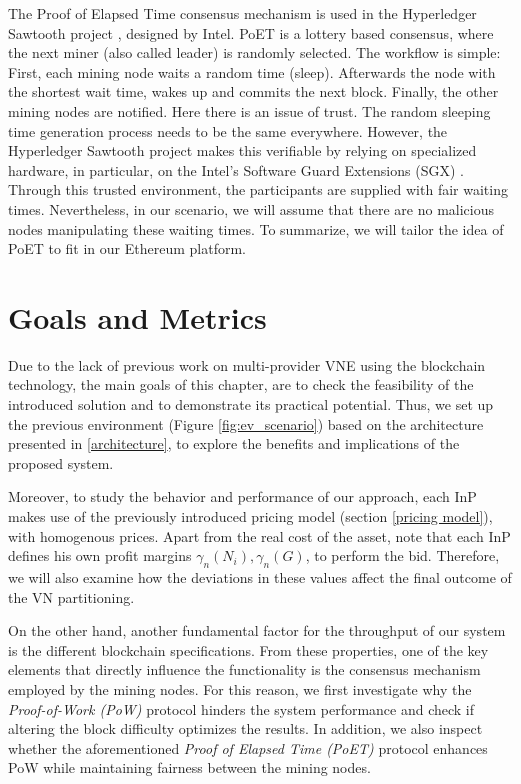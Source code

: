 The Proof of Elapsed Time consensus mechanism is used in the Hyperledger Sawtooth project \citep{sawtooth}, designed by Intel. PoET is a lottery based consensus, where the next miner (also called leader) is randomly selected. The workflow is simple: First, each mining node waits a random time (sleep). Afterwards the node with the shortest wait time, wakes up and commits the next block. Finally, the other mining nodes are notified. Here there is an issue of trust. The random sleeping time generation process needs to be the same everywhere. However, the Hyperledger Sawtooth project makes this verifiable by relying on specialized hardware, in particular, on the Intel’s Software Guard Extensions (SGX) \citep{sgx}. Through this trusted environment, the participants are supplied with fair waiting times. Nevertheless, in our scenario, we will assume that there are no malicious nodes manipulating these waiting times. To summarize, we will tailor the idea of PoET to fit in our Ethereum platform.
 
\section{Goals and Metrics}  \label{metrics}

Due to the lack of previous work on multi-provider VNE using the blockchain technology, the main goals of this chapter, are to check the feasibility of the introduced solution and to demonstrate its practical potential. Thus, we set up the previous environment (Figure \ref{fig:ev_scenario}) based on the architecture presented in \ref{architecture}, to explore the benefits and implications of the proposed system.

Moreover, to study the behavior and performance of our approach, each InP makes use of the previously introduced pricing model (section \ref{pricing model}), with homogenous prices. Apart from the real cost of the asset, note that each InP defines his own profit margins $\gamma_n(N_i),\gamma_n(G)$, to perform the bid. Therefore, we will also examine how the deviations in these values affect the final outcome of the VN partitioning.

On the other hand, another fundamental factor for the throughput of our system is the different blockchain specifications. From these properties, one of the key elements that directly influence the functionality is the consensus mechanism employed by the mining nodes. For this reason, we first investigate why the \textit{Proof-of-Work (PoW)} protocol hinders the system performance and check if altering the block difficulty optimizes the results. In addition, we also inspect whether the aforementioned \textit{Proof of Elapsed Time (PoET)} protocol enhances PoW while maintaining fairness between the mining nodes.

